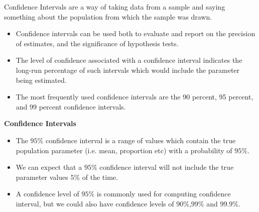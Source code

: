 \documentclass[]{report}
\begin{document}
Confidence Intervals are a way of taking data from a sample and saying something about the population from which the sample was drawn.

\begin{itemize}
\item Confidence intervals can be used both to evaluate and report on the precision of estimates, and the significance of hypothesis tests.


\item The level of confidence associated with a confidence interval indicates the long-run percentage of such intervals which would include the parameter being estimated.

\item The most frequently used confidence intervals are the 90 percent, 95 percent, and 99 percent confidence intervals.
\end{itemize}






\textbf{Confidence Intervals }

\begin{itemize}
\item The $95\%$ confidence interval is a range of values which contain the true population parameter (i.e. mean, proportion etc) with a probability of $95\%$. \smallskip
\item We can expect that a $95\%$ confidence interval will not include the true parameter values $5\%$ of the time.\smallskip
\item A confidence level of $95\%$ is commonly used for computing confidence interval, but we could also have confidence levels of $90\%$,$99\%$ and $99.9\%$.
\end{itemize}



\end{document}

